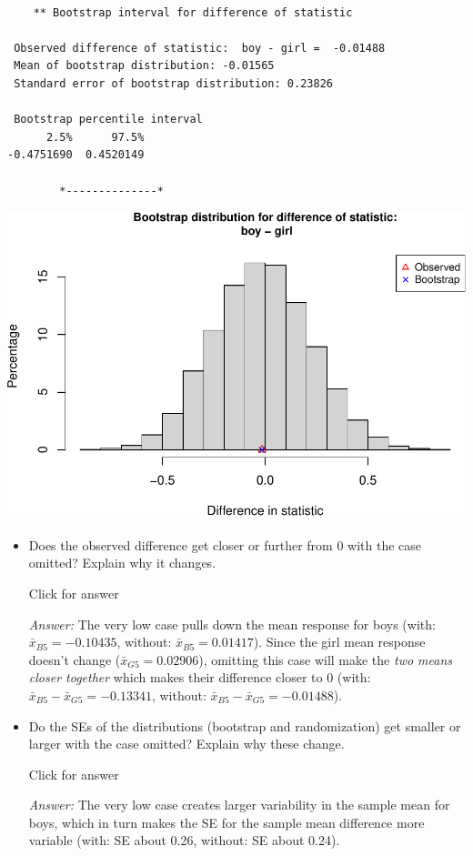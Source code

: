 \documentclass[
]{book}
\begin{document}
\begin{verbatim}

    ** Bootstrap interval for difference of statistic

 Observed difference of statistic:  boy - girl =  -0.01488 
 Mean of bootstrap distribution: -0.01565 
 Standard error of bootstrap distribution: 0.23826 

 Bootstrap percentile interval
      2.5%      97.5% 
-0.4751690  0.4520149 

        *--------------*
\end{verbatim}

\includegraphics[width=1\linewidth]{Class_Activity_14_files/figure-latex/unnamed-chunk-13-2}

\begin{itemize}
\item
  Does the observed difference get closer or further from 0 with the case omitted? Explain why it changes.

  Click for answer

  \emph{Answer:} The very low case pulls down the mean response for boys (with: \(\bar{x}_{B5} = -0.10435\), without: \(\bar{x}_{B5} = 0.01417\)). Since the girl mean response doesn't change (\(\bar{x}_{G5} = 0.02906\)), omitting this case will make the \emph{two means closer together} which makes their difference closer to 0 (with: \(\bar{x}_{B5} - \bar{x}_{G5} = -0.13341\), without: \(\bar{x}_{B5} - \bar{x}_{G5} = -0.01488\)).

  \vspace*{.5in}
\item
  Do the SEs of the distributions (bootstrap and randomization) get smaller or larger with the case omitted? Explain why these change.

  Click for answer

  \emph{Answer:} The very low case creates larger variability in the sample mean for boys, which in turn makes the SE for the sample mean difference more variable (with: SE about 0.26, without: SE about 0.24).
\end{itemize}
\end{document}
